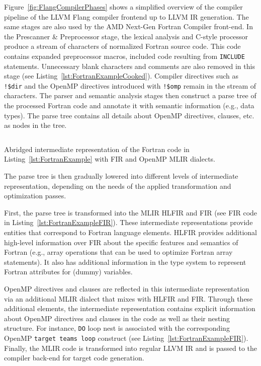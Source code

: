 \documentclass[acmtog,natbib=false]{acmart}
\newcommand{\code}[1]{\texttt{#1}\xspace}
\begin{document}
Figure~\ref{fig:FlangCompilerPhases} shows a simplified overview of the compiler pipeline of the LLVM Flang compiler frontend up to LLVM \ac{IR} generation.
The same stages are also used by the AMD Next-Gen Fortran Compiler front-end.
In the Prescanner \& Preprocessor stage, the lexical analysis and C-style processor produce a stream of characters of normalized Fortran source code. 
This code contains expanded preprocessor macros, included code resulting from \code{INCLUDE} statements. Unnecessary blank characters and comments are also removed in this stage (see Listing~\ref{lst:FortranExampleCooked}).
Compiler directives such as \code{!\$dir} and the OpenMP directives introduced with \code{!\$omp} remain in the stream of characters.
The parser and semantic analysis stages then construct a parse tree of the processed Fortran code and annotate it with semantic information (e.g., data types).
The parse tree contains all details about OpenMP directives, clauses, etc. as nodes in the tree.

\begin{listing}[t]
\inputminted{MLIR-lexer.py:MlirLexer -x}{code/tgt_loop_abridged.fir}
\caption{Abridged intermediate representation of the Fortran code in Listing~\ref{lst:FortranExample} with \ac{FIR} and OpenMP \ac{MLIR} dialects.}
\label{lst:FortranExampleFIR}
\end{listing}

The parse tree is then gradually lowered into different levels of intermediate representation, depending on the needs of the applied transformation and optimization passes.

First, the parse tree is transformed into the \ac{MLIR} \ac{HLFIR} and \ac{FIR} (see \ac{FIR} code in  Listing~\ref{lst:FortranExampleFIR}).
These intermediate representations provide entities that correspond to Fortran language elements.
\Ac{HLFIR} provides additional high-level information over \ac{FIR} about the specific features and semantics of Fortran (e.g., array operations that can be used to optimize Fortran array statements).
It also has additional information in the type system to represent Fortran attributes for (dummy) variables.

OpenMP directives and clauses are reflected in this intermediate representation via an additional \ac{MLIR} dialect that mixes with \ac{HLFIR} and \ac{FIR}.
Through these additional elements, the intermediate representation contains explicit information about  OpenMP directives and clauses in the code as well as their nesting structure.
For instance, \code{DO} loop nest is associated with the corresponding OpenMP \code{target teams loop} construct (see Listing~\ref{lst:FortranExampleFIR}).
Finally, the \ac{MLIR} code is transformed into regular LLVM \ac{IR} and is passed to the compiler back-end for target code generation.
\end{document}
